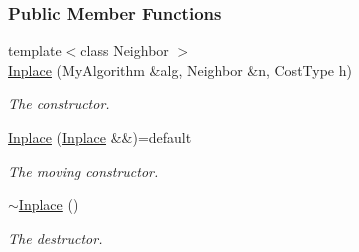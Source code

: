 \subsubsection*{Public Member Functions}
\begin{DoxyCompactItemize}
\item 
{\footnotesize template$<$class Neighbor $>$ }\\\hyperlink{structslb_1_1ext_1_1policy_1_1backtrackLock_1_1Inplace_3_01MyAlgorithm_00_01true_01_4_a6f70a5ab71cccf4d4442f43fd660a68b}{Inplace} (My\+Algorithm \&alg, Neighbor \&n, Cost\+Type h)
\begin{DoxyCompactList}\small\item\em The constructor. \end{DoxyCompactList}\item 
\hyperlink{structslb_1_1ext_1_1policy_1_1backtrackLock_1_1Inplace_3_01MyAlgorithm_00_01true_01_4_acf1e0f412c740f8c5d5936361d2f0e6f}{Inplace} (\hyperlink{structslb_1_1ext_1_1policy_1_1backtrackLock_1_1Inplace}{Inplace} \&\&)=default\hypertarget{structslb_1_1ext_1_1policy_1_1backtrackLock_1_1Inplace_3_01MyAlgorithm_00_01true_01_4_acf1e0f412c740f8c5d5936361d2f0e6f}{}\label{structslb_1_1ext_1_1policy_1_1backtrackLock_1_1Inplace_3_01MyAlgorithm_00_01true_01_4_acf1e0f412c740f8c5d5936361d2f0e6f}

\begin{DoxyCompactList}\small\item\em The moving constructor. \end{DoxyCompactList}\item 
\hyperlink{structslb_1_1ext_1_1policy_1_1backtrackLock_1_1Inplace_3_01MyAlgorithm_00_01true_01_4_a0ccbddccfba4038e9b87e2712f76cda9}{$\sim$\+Inplace} ()\hypertarget{structslb_1_1ext_1_1policy_1_1backtrackLock_1_1Inplace_3_01MyAlgorithm_00_01true_01_4_a0ccbddccfba4038e9b87e2712f76cda9}{}\label{structslb_1_1ext_1_1policy_1_1backtrackLock_1_1Inplace_3_01MyAlgorithm_00_01true_01_4_a0ccbddccfba4038e9b87e2712f76cda9}

\begin{DoxyCompactList}\small\item\em The destructor. \end{DoxyCompactList}\end{DoxyCompactItemize}

